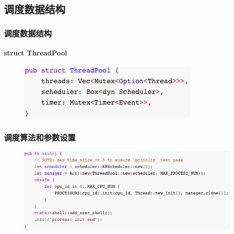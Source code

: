 % 
% 
\subsection{调度数据结构} %
\begin{frame}[fragile]
    \frametitle{调度数据结构}
    \framesubtitle{struct ThreadPool}
\begin{figure}
    \includegraphics[width=0.55\linewidth]{figs/ThreadPool.png}
    \end{figure}
\end{frame}
% 
% 
% 
% 
% 
\begin{frame}[fragile]
    \frametitle{调度算法和参数设置}
\begin{figure}
    \includegraphics[width=0.9\linewidth]{figs/scheduler-init.png}
    \end{figure}
\end{frame}
